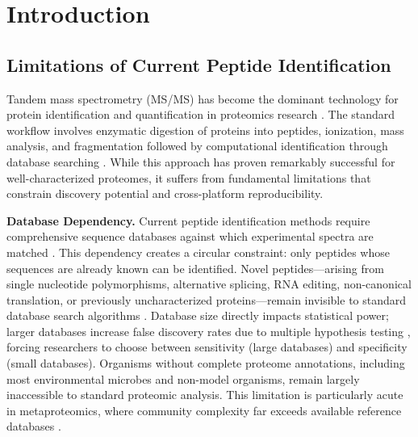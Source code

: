 \documentclass[11pt,twocolumn]{article}
\newcommand{\msms}{MS/MS}
\begin{document}
\section{Introduction}

\subsection{Limitations of Current Peptide Identification}

Tandem mass spectrometry (\msms{}) has become the dominant technology for protein identification and quantification in proteomics research \cite{aebersold2016mass}. The standard workflow involves enzymatic digestion of proteins into peptides, ionization, mass analysis, and fragmentation followed by computational identification through database searching \cite{cox2008maxquant}. While this approach has proven remarkably successful for well-characterized proteomes, it suffers from fundamental limitations that constrain discovery potential and cross-platform reproducibility.

\textbf{Database Dependency.} Current peptide identification methods require comprehensive sequence databases against which experimental spectra are matched \cite{nesvizhskii2007survey}. This dependency creates a circular constraint: only peptides whose sequences are already known can be identified. Novel peptides---arising from single nucleotide polymorphisms, alternative splicing, RNA editing, non-canonical translation, or previously uncharacterized proteins---remain invisible to standard database search algorithms \cite{wang2018novo}. Database size directly impacts statistical power; larger databases increase false discovery rates due to multiple hypothesis testing \cite{kall2008posterior}, forcing researchers to choose between sensitivity (large databases) and specificity (small databases). Organisms without complete proteome annotations, including most environmental microbes and non-model organisms, remain largely inaccessible to standard proteomic analysis. This limitation is particularly acute in metaproteomics, where community complexity far exceeds available reference databases \cite{muth2015metaproteomics}.
\end{document}
